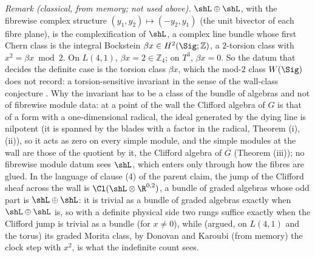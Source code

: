 \emph{Remark (classical, from memory; not used above).} $\shL \oplus \shL$, with the fibrewise complex structure $(y_{1}, y_{2}) \mapsto (-y_{2}, y_{1})$ (the unit bivector of each fibre plane), is the complexification of $\shL$, a complex line bundle whose first Chern class is the integral Bockstein $\beta x \in H^{2}(\Sig;\mathbb{Z})$, a $2$-torsion class with $x^{2} = \beta x \bmod 2$. On $L(4,1)$, $\beta x = 2 \in \mathbb{Z}_4$; on $T^{3}$, $\beta x = 0$. So the datum that decides the definite case is the torsion class $\beta x$, which the mod-2 class $W(\Sig)$ does not record: a torsion-sensitive invariant in the sense of the wall-class conjecture . Why the invariant has to be a class of the bundle of algebras and not of fibrewise module data: at a point of the wall the Clifford algebra of $G$ is that of a form with a one-dimensional radical, the ideal generated by the dying line is nilpotent (it is spanned by the blades with a factor in the radical, Theorem (i), (ii)), so it acts as zero on every simple module, and the simple modules at the wall are those of the quotient by it, the Clifford algebra of $\overline G$ (Theorem (iii)); no fibrewise module datum sees $\shL$, which enters only through how the fibres are glued. In the language of clause (4) of the parent claim, the jump of the Clifford sheaf across the wall is $\Cl(\shL \otimes \R^{0,2})$, a bundle of graded algebras whose odd part is $\shL \oplus \shL$: it is trivial as a bundle of graded algebras exactly when $\shL\oplus\shL$ is, so with a definite physical side two rungs suffice exactly when the Clifford jump is trivial as a bundle (for $x \neq 0$), while (argued, on $L(4,1)$ and the torus) its graded Morita class, by Donovan and Karoubi (from memory) the clock step with $x^{2}$, is what the indefinite count sees.
